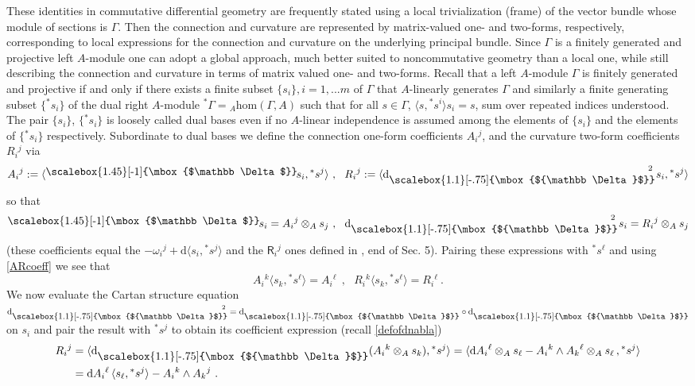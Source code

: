 \documentclass[12pt]{article}
\numberwithin{equation}{section}
\theoremstyle{plain}
\theoremstyle{definition}
\theoremstyle{remark}
\def\oA{\otimes_A}
\def\dd{\mathrm{d}}
\def\le{\langle}
\def\re{\rangle}
\def\le{\langle}
\def\re{\rangle}
\def\AA{A}
\def\dd{{\nabla}}
\def\Rsf{\mathsf{R}}
\def\dd{\mathrm{d}}
\def\std{{\raisebox{\depth}{\scalebox{1.45}[-1]{\mbox{$\mathbb \Delta$}}}}_{\!}}
\def\pstd{{}^{\phantom{J}}_{\raisebox{\depth}{\scalebox{1.1}[-.75]{\mbox{${\mathbb
            \Delta}$}}}}}
\def\stD{\dd\pstd}
\def\stD{\dd\pstd}
\def\hom{\mathrm{hom}}
\begin{document}
These identities in commutative differential geometry are frequently stated using a local trivialization (frame) of the vector bundle whose module of sections is $\Gamma$. 
Then the connection and curvature are represented by matrix-valued one- and two-forms, respectively, corresponding to local expressions for the connection and curvature on the underlying principal bundle. Since $\Gamma$ is a finitely generated and projective left $A$-module one can adopt a global approach, much better suited to noncommutative geometry than a local one, while still describing the connection and curvature in terms of matrix valued one- and two-forms. Recall that a left $A$-module $\Gamma$ is finitely generated and projective if and only if there exists a finite subset $\{s_i\}, i=1,...m$ of $\Gamma$ that $A$-linearly generates $\Gamma$ and similarly a finite generating subset $\{{}^*s_i\}$ of the dual right $A$-module ${}^*\Gamma={}_\AA\hom(\Gamma,A)$ such that for all $s\in \Gamma$, $\le s,{}^*s^i\re s_i=s$, sum over repeated indices understood.
The pair  $\{s_i\}$, $\{{}^*s_i\}$ is loosely called dual bases even if no $A$-linear independence is assumed among the elements of $\{s_i\}$ and the elements of $\{{}^*s_i\}$ respectively.
Subordinate to dual bases we define the connection one-form coefficients $A_i{}^j$,  and the curvature two-form coefficients $R_i{}^j$ via 
\begin{equation}\label{ARcoeff}
  A_i{}^j:=\le \std s_i,{}^*s^j\re~,~~R_i{}^j:=\le {\stD}^{\!\!\!\!\!2} \;s_i,{}^*s^j\re
  \end{equation}
  so that
  \begin{equation}
    \std s_i=A_i{}^j\oA s_j~,~~{\stD}^{\!\!\!\!\!2}\; s_i=R_i{}^j\oA s_j
  \end{equation}
  (these coefficients equal the $-\omega_i{}^j+\dd\le s_i,{}^*s^j\re$ and the $\Rsf_i{}^j$ ones defined in \cite{LC}, end of Sec. 5). Pairing these expressions with ${}^{*\!}s^\ell$ and using \eqref{ARcoeff} we see that
  \begin{equation}\label{ALEREA}
    A_i{}^k\le s_k,{}^*s^\ell\re=A_i{}^\ell~~,~~~R_i{}^k\le s_k,{}^*s^\ell\re = R_i{}^\ell~.
    \end{equation}
    We now evaluate the Cartan structure equation ${\stD}^{\!\!\!\!\!2}\,=\stD\circ \stD$ on $s_i$ and pair the result with ${}^* s^j$ to obtain its coefficient expression (recall \eqref{defofdnabla})
    \begin{equation}
      \begin{split}
        R_i{}^j&=\le\stD(A_i{}^k\oA s_k),{}^*s^j\re=\le \dd A_i{}^\ell\oA s_\ell-A_i{}^k\wedge A_k{}^\ell\oA s_\ell\,,{}^*s^j\re\\ &= \dd A_i{}^\ell \,\le s_\ell, {}^*s^j\re -A_i{}^k\wedge A_k{}^j~.
      \end{split}
    \end{equation}
\end{document}
